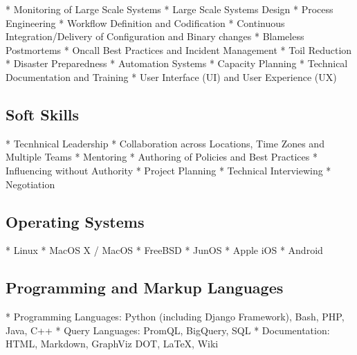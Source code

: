 \documentclass[a4paper, 11pt] {article}
\begin{document}
* Monitoring of Large Scale Systems
* Large Scale Systems Design
* Process Engineering
* Workflow Definition and Codification
* Continuous Integration/Delivery of Configuration and Binary changes
* Blameless Postmortems
* Oncall Best Practices and Incident Management
* Toil Reduction
* Disaster Preparedness
* Automation Systems
* Capacity Planning
* Technical Documentation and Training
* User Interface (UI) and User Experience (UX)

\subsection*{Soft Skills}

* Tecnhnical Leadership
* Collaboration across Locations, Time Zones and Multiple Teams
* Mentoring
* Authoring of Policies and Best Practices
* Influencing without Authority
* Project Planning
* Technical Interviewing
* Negotiation

\subsection*{Operating Systems}

* Linux
* MacOS X / MacOS
* FreeBSD
* JunOS
* Apple iOS
* Android

\subsection*{Programming and Markup Languages}

* Programming Languages: Python (including Django Framework), Bash, PHP, Java, C++
* Query Languages: PromQL, BigQuery, SQL
* Documentation: HTML, Markdown, GraphViz DOT, LaTeX, Wiki
\end{document}
